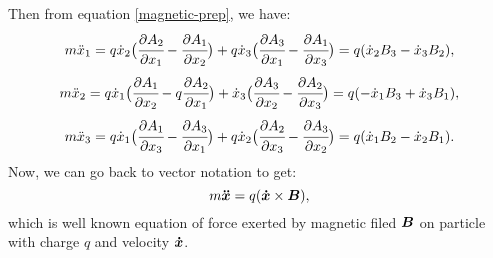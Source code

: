 \documentclass[main.tex]{subfiles}
\begin{document}
Then from equation \ref{magnetic-prep}, we have:
\begin{equation}
m \ddot{x}_1 = q\dot{x}_2 \big(\cfrac{\partial A_2}{\partial x_1} - \cfrac{\partial A_1}{\partial x_2}\big) + q\dot{x}_3 \big(\cfrac{\partial A_3}{\partial x_1} - \cfrac{\partial A_1}{\partial x_3}\big) = q(\dot{x}_2 B_3 - \dot{x}_3 B_2),
\end{equation}
\begin{equation}
m \ddot{x}_2 = q\dot{x}_1 \big(\cfrac{\partial A_1}{\partial x_2} - q\cfrac{\partial A_2}{\partial x_1}\big) + \dot{x}_3 \big(\cfrac{\partial A_3}{\partial x_2} - \cfrac{\partial A_2}{\partial x_3}\big) = q(-\dot{x}_1 B_3  + \dot{x}_3 B_1),
\end{equation}
\begin{equation}
m \ddot{x}_3 = q\dot{x}_1 \big(\cfrac{\partial A_1}{\partial x_3} - \cfrac{\partial A_3}{\partial x_1}\big) + q\dot{x}_2 \big(\cfrac{\partial A_2}{\partial x_3} - \cfrac{\partial A_3}{\partial x_2}\big) = q(\dot{x}_1 B_2 - \dot{x}_2 B_1).
\end{equation}
Now, we can go back to vector notation to get:
\begin{equation}
m\boldsymbol{\ddot{x}} = q(\boldsymbol{\dot{x}} \times \boldsymbol{B}),
\end{equation}
which is well known equation of force exerted by magnetic filed $\boldsymbol{B}$ on particle with charge $q$ and velocity $\boldsymbol{\dot{x}}$.
\end{document}
